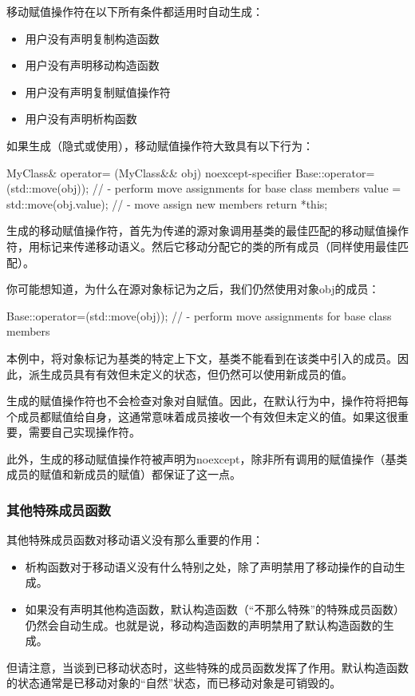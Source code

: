 移动赋值操作符在以下所有条件都适用时自动生成：

\begin{itemize}
	\item 用户没有声明复制构造函数
	\item 用户没有声明移动构造函数
	\item 用户没有声明复制赋值操作符
	\item 用户没有声明析构函数
\end{itemize}

如果生成（隐式或使用），移动赋值操作符大致具有以下行为：

\begin{cppcode}
MyClass& operator= (MyClass&& obj) noexcept-specifier {
	Base::operator=(std::move(obj)); // - perform move assignments for base class members
	value = std::move(obj.value); // - move assign new members
	return *this;
}
\end{cppcode}

生成的移动赋值操作符，首先为传递的源对象调用基类的最佳匹配的移动赋值操作符，用标记来传递移动语义。然后它移动分配它的类的所有成员（同样使用最佳匹配）。

你可能想知道，为什么在源对象标记为之后，我们仍然使用对象obj的成员：

\begin{cppcode}
Base::operator=(std::move(obj)); // - perform move assignments for base class members
\end{cppcode}

本例中，将对象标记为基类的特定上下文，基类不能看到在该类中引入的成员。因此，派生成员具有有效但未定义的状态，但仍然可以使用新成员的值。

生成的赋值操作符也不会检查对象对自赋值。因此，在默认行为中，操作符将把每个成员都赋值给自身，这通常意味着成员接收一个有效但未定义的值。如果这很重要，需要自己实现操作符。

此外，生成的移动赋值操作符被声明为noexcept，除非所有调用的赋值操作（基类成员的赋值和新成员的赋值）都保证了这一点。

\subsubsection{其他特殊成员函数}

其他特殊成员函数对移动语义没有那么重要的作用：

\begin{itemize}
	\item 析构函数对于移动语义没有什么特别之处，除了声明禁用了移动操作的自动生成。
	\item 如果没有声明其他构造函数，默认构造函数（“不那么特殊”的特殊成员函数）仍然会自动生成。也就是说，移动构造函数的声明禁用了默认构造函数的生成。
\end{itemize}

但请注意，当谈到已移动状态时，这些特殊的成员函数发挥了作用。默认构造函数的状态通常是已移动对象的“自然”状态，而已移动对象是可销毁的。

















